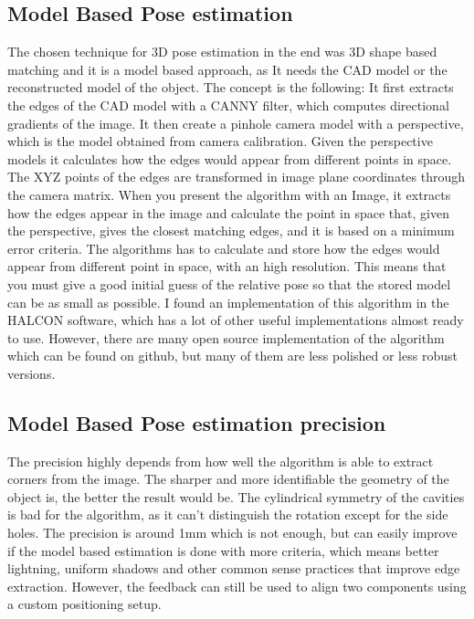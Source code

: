 \documentclass[12pt,a4paper]{article}
\begin{document}
\newpage

\subsection{Model Based Pose estimation}

The chosen technique for 3D pose estimation in the end was 3D shape based matching and it is a model based approach, as It needs the CAD model or the reconstructed model of the object.
The concept is the following:
It first extracts the edges of the CAD model with a CANNY filter, which computes directional gradients of the image. It then create a pinhole camera model with a perspective, which is the model obtained from camera calibration. Given the perspective models it calculates how the edges would appear from different points in space. The XYZ points of the edges are transformed in image plane coordinates through the camera matrix. When you present the algorithm with an Image, it extracts how the edges appear in the image and calculate the point in space that, given the perspective, gives the closest matching edges, and it is based on a minimum error criteria. The algorithms has to calculate and store how the edges would appear from different point in space, with an high resolution. This means that you must give a good initial guess of the relative pose so that the stored model can be as small as possible.
I found an implementation of this algorithm in the HALCON software, which has a lot of other useful implementations almost ready to use. However, there are many open source implementation of the algorithm which can be found on github, but many of them are less polished or less robust versions.


\subsection{Model Based Pose estimation precision}
The precision highly depends from how well the algorithm is able to extract corners from the image. The sharper and more identifiable the geometry of the object is, the better the result would be. The cylindrical symmetry of the cavities is bad for the algorithm, as it can't distinguish the rotation except for the side holes. The precision is around 1mm which is not enough, but can easily improve if the model based estimation is done with more criteria, which means better lightning, uniform shadows and other common sense practices that improve edge extraction. However, the feedback can still be used to align two components using a custom positioning setup.
\end{document}
